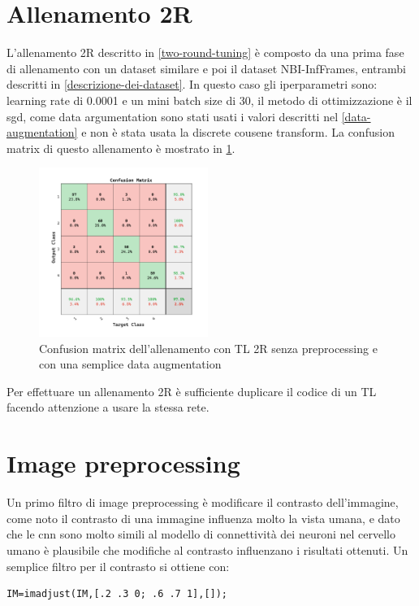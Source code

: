 \section{Allenamento 2R}\label{allenamento-2r}

L'allenamento 2R descritto in \cref{two-round-tuning} è composto da una prima fase di allenamento con un dataset similare e poi il dataset NBI-InfFrames, entrambi descritti in  \cref{descrizione-dei-dataset}. In questo caso gli iperparametri sono:   learning rate di 0.0001 e un mini batch size di 30, il metodo di ottimizzazione è il \gls{sgd}, come data argumentation sono stati usati i valori descritti nel \cref{data-augmentation} e non è stata usata la discrete cousene transform. La confusion matrix di questo allenamento è mostrato in \cref{fig:result-two-liscio}.


\begin{figure}[H]
    \centering
    \includegraphics[width=0.49\textwidth]{addestramento-rete-neurale/two-liscio.pdf}
    \caption{Confusion matrix dell'allenamento con TL 2R senza preprocessing e con una semplice data augmentation}
    \label{fig:result-two-liscio}
\end{figure}

Per effettuare un allenamento 2R è sufficiente duplicare il codice di un TL facendo attenzione a usare la stessa rete.

\section{Image preprocessing}\label{image-preprocessing}

Un primo filtro di image preprocessing è modificare il contrasto dell'immagine, come noto il contrasto di una immagine influenza molto la vista umana, e dato che le \gls{cnn} sono molto simili al modello di connettività dei neuroni nel cervello umano è plausibile che modifiche al contrasto influenzano i risultati  ottenuti. Un semplice filtro per il contrasto si ottiene con:
\begin{lstlisting}
IM=imadjust(IM,[.2 .3 0; .6 .7 1],[]);    
\end{lstlisting}

